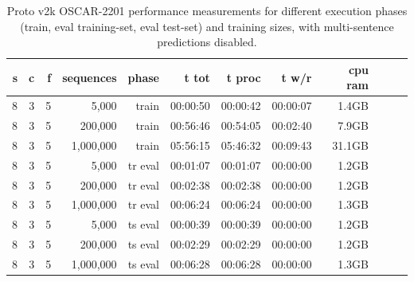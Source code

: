 \begin{table}[H]
\centering
\caption{Proto v2k OSCAR-2201 performance measurements for different execution phases (train, eval training-set, eval test-set) and training sizes, with multi-sentence predictions disabled.}
\label{tab:protov2k-oscar-performance}
\begin{tabular}{rrrrrrrrrrrr}
\toprule
\textbf{s} & \textbf{c} & \textbf{f} & \textbf{sequences} & \textbf{phase} & \textbf{t tot} & \textbf{t proc} & \textbf{t w/r} & \textbf{cpu ram} \\
\midrule
8 & 3 & 5 & 5,000       & train   & 00:00:50 & 00:00:42 & 00:00:07 & 1.4GB \\
8 & 3 & 5 & 200,000     & train   & 00:56:46 & 00:54:05 & 00:02:40 & 7.9GB \\
8 & 3 & 5 & 1,000,000   & train   & 05:56:15 & 05:46:32 & 00:09:43 & 31.1GB \\
8 & 3 & 5 & 5,000       & tr eval & 00:01:07 & 00:01:07 & 00:00:00 & 1.2GB \\
8 & 3 & 5 & 200,000     & tr eval & 00:02:38 & 00:02:38 & 00:00:00 & 1.2GB \\
8 & 3 & 5 & 1,000,000   & tr eval & 00:06:24 & 00:06:24 & 00:00:00 & 1.3GB \\
8 & 3 & 5 & 5,000       & ts eval & 00:00:39 & 00:00:39 & 00:00:00 & 1.2GB \\
8 & 3 & 5 & 200,000     & ts eval & 00:02:29 & 00:02:29 & 00:00:00 & 1.2GB \\
8 & 3 & 5 & 1,000,000   & ts eval & 00:06:28 & 00:06:28 & 00:00:00 & 1.3GB \\
\bottomrule
\end{tabular}
\end{table}

